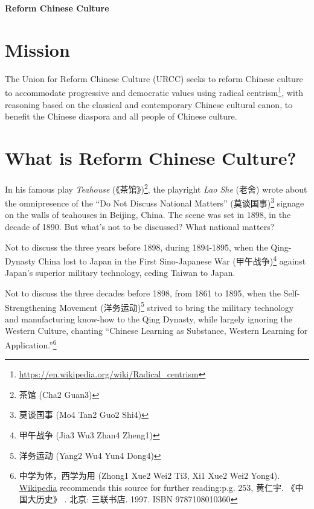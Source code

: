 \documentclass[12pt]{article}
\begin{document}
\begin{center}
    {\Huge\bfseries\color{titlecolor} Reform Chinese Culture}\\[0.5cm]
\end{center}

\vspace{2cm}

\section{Mission}

The Union for Reform Chinese Culture (URCC) seeks to reform Chinese culture to accommodate progressive and democratic values using radical centrism\footnote{\href{https://en.wikipedia.org/wiki/Radical\_centrism}{https://en.wikipedia.org/wiki/Radical\_centrism}}, with reasoning based on the classical and contemporary Chinese cultural canon, to benefit the Chinese diaspora and all people of Chinese culture.

\section{What is Reform Chinese Culture?}

In his famous play \textit{Teahouse} (《茶馆》)\footnote{茶馆 (Cha2 Guan3)}, the playright \textit{Lao She} (老舍) wrote about the omnipresence of the ``Do Not Discuss National Matters'' (莫谈国事)\footnote{莫谈国事 (Mo4 Tan2 Guo2 Shi4)} signage on the walls of teahouses in Beijing, China. The scene was set in 1898, in the decade of 1890. But what's not to be discussed? What national matters?

Not to discuss the three years before 1898, during 1894-1895, when the Qing-Dynasty China lost to Japan in the First Sino-Japanese War (甲午战争)\footnote{甲午战争 (Jia3 Wu3 Zhan4 Zheng1)} against Japan's superior military technology, ceding Taiwan to Japan.

Not to discuss the three decades before 1898, from 1861 to 1895, when the Self-Strengthening Movement (洋务运动)\footnote{洋务运动 (Yang2 Wu4 Yun4 Dong4)} strived to bring the military technology and manufacturing know-how to the Qing Dynasty, while largely ignoring the Western Culture, chanting ``Chinese Learning as Substance, Western Learning for Application.''\footnote{中学为体，西学为用 (Zhong1 Xue2 Wei2 Ti3, Xi1 Xue2 Wei2 Yong4). \href{https://zh.wikipedia.org/wiki/\%E6\%B4\%8B\%E5\%8A\%A1\%E8\%BF\%90\%E5\%8A\%A8\#cite\_ref-\%E9\%BB\%83\_17-0}{Wikipedia} recommends this source for further reading:p.g. 253, 黄仁宇. 《中国大历史》 . 北京: 三联书店. 1997. ISBN 9787108010360}
\end{document}
